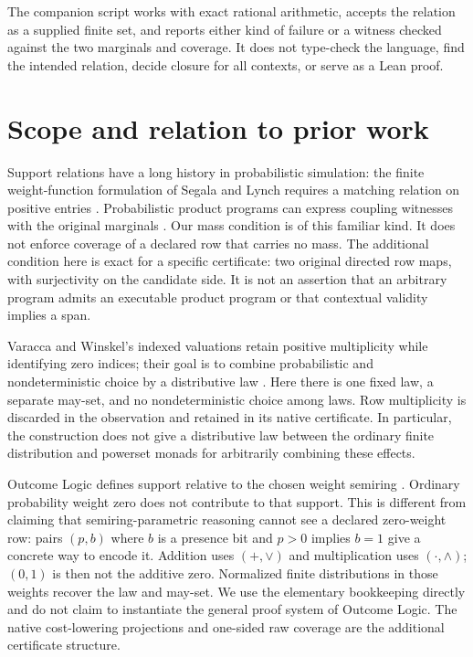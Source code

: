 \documentclass[11pt]{article}
\theoremstyle{definition}
\begin{document}
The companion script works with exact rational arithmetic, accepts
the relation as a supplied finite set, and reports either kind of
failure or a witness checked against the two marginals and coverage.
It does not type-check the language, find the intended relation, decide
closure for all contexts, or serve as a Lean proof.

\section{Scope and relation to prior work}
Support relations have a long history in probabilistic simulation:
the finite weight-function formulation of Segala and Lynch requires a
matching relation on positive entries \cite{segalalynch}. Probabilistic
product programs can express coupling witnesses with the original
marginals \cite{barthe}. Our mass condition is of this familiar kind.
It does not enforce coverage of a declared row that carries no mass.
The additional condition here is exact for a specific certificate:
two original directed row maps, with surjectivity on the candidate
side. It is not an assertion that an arbitrary program admits an
executable product program or that contextual validity implies a span.

Varacca and Winskel's indexed valuations retain positive
multiplicity while identifying zero indices; their goal is to combine
probabilistic and nondeterministic choice by a distributive law
\cite[Defs.~4.1--4.5]{varaccawinskel}. Here there is one fixed law, a
separate may-set, and no nondeterministic choice among laws. Row
multiplicity is discarded in the observation and retained in its native
certificate. In particular, the construction does not give a
distributive law between the ordinary finite distribution and powerset
monads for arbitrarily combining these effects.

Outcome Logic defines support relative to the chosen weight semiring
\cite[Def.~3.6 and Sec.~6.1]{outcomelogic}. Ordinary probability weight
zero does not contribute to that support. This is different from
claiming that semiring-parametric reasoning cannot see a declared
zero-weight row: pairs $(p,b)$ where $b$ is a presence bit and $p>0$
implies $b=1$ give a concrete way to encode it. Addition uses
$(+,\lor)$ and multiplication uses $(\cdot,\land)$; $(0,1)$ is then
not the additive zero. Normalized finite distributions in those
weights recover the law and may-set. We use the elementary
bookkeeping directly and do not claim to instantiate the general proof
system of Outcome Logic. The native cost-lowering projections and
one-sided raw coverage are the additional certificate structure.
\end{document}
